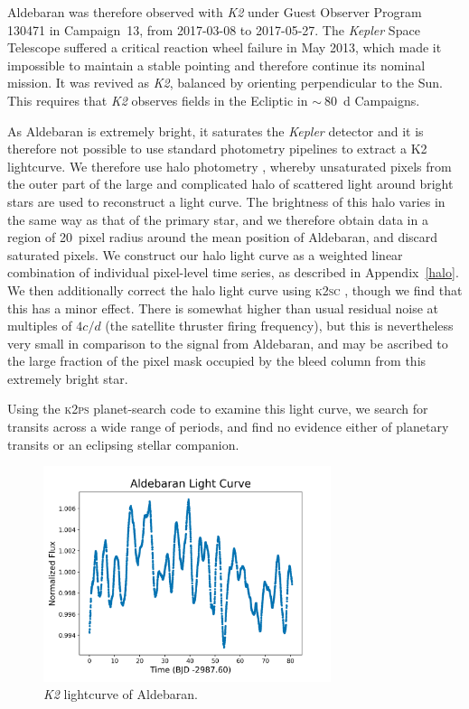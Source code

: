 \documentclass[modern]{aastex61}
\newcommand{\kepler}{\emph{Kepler}\xspace}
\newcommand{\ktwo}{\emph{K2}\xspace}
\begin{document}
Aldebaran was therefore observed with \ktwo under Guest Observer Program 130471 in Campaign~13, from 2017-03-08 to 2017-05-27. The \kepler Space Telescope \citep{2010sci...327..977b}  
suffered a critical reaction wheel failure in May 2013, which made it impossible to maintain a stable pointing and therefore continue its nominal mission. It was revived as \ktwo \citep{howell14}, balanced by orienting perpendicular to the Sun. This requires that \ktwo observes fields in the Ecliptic in $\sim~80$~d Campaigns. 

As Aldebaran is extremely bright, it saturates the \kepler detector and it is therefore not possible to use standard photometry pipelines to extract a K2 lightcurve. We therefore use halo photometry \citep[as originally implemented in]{White2017}, whereby unsaturated pixels from the outer part of the large and complicated halo of scattered light around bright stars are used to reconstruct a light curve. The brightness of this halo varies in the same way as that of the primary star, and we therefore obtain data in a region of 20~pixel radius around the mean position of Aldebaran, and discard saturated pixels. We construct our halo light curve as a weighted linear combination of individual pixel-level time series, as described in Appendix~\ref{halo}. We then additionally correct the halo light curve using \textsc{k2sc} \citep{k2sc}, though we find that this has a minor effect. There is somewhat higher than usual residual noise at multiples of $4 c/d$ (the satellite thruster firing frequency), but this is nevertheless very small in comparison to the signal from Aldebaran, and may be ascribed to the large fraction of the pixel mask occupied by the bleed column from this extremely bright star.

Using the \textsc{k2ps} planet-search code \citep{k2ps,Pope2016} to examine this light curve, we search for transits across a wide range of periods, and find no evidence either of planetary transits or an eclipsing stellar companion.

\begin{figure}
\centering
\includegraphics[width=0.75\textwidth]{Aldebaran_lc.png}
\caption{\ktwo lightcurve of Aldebaran.}
\label{k2_lightcurve}
\end{figure}
\end{document}
